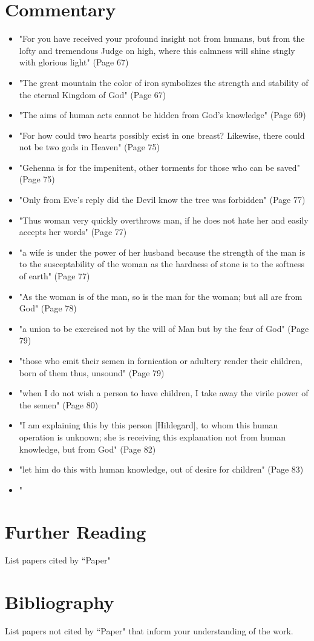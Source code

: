\documentclass{article}
\begin{document}
\section{Commentary}
\begin{itemize}

    \item "For you have received your profound insight not from humans, but from the lofty and tremendous Judge on high, where this calmness will shine stngly with glorious light" (Page 67)
    \item "The great mountain the color of iron symbolizes the strength and stability of the eternal Kingdom of God" (Page 67)
    \item "The aims of human acts cannot be hidden from God's knowledge" (Page 69)
    \item "For how could two hearts possibly exist in one breast? Likewise, there could not be two gods in Heaven" (Page 75)
    \item "Gehenna is for the impenitent, other torments for those who can be saved" (Page 75)
    \item "Only from Eve's reply did the Devil know the tree was forbidden" (Page 77)
    \item "Thus woman very quickly overthrows man, if he does not hate her and easily accepts her words" (Page 77)
    \item "a wife is under the power of her husband because the strength of the man is to the susceptability of the woman as the hardness of stone is to the softness of earth" (Page 77)
    \item "As the woman is of the man, so is the man for the woman; but all are from God" (Page 78)
    \item "a union to be exercised not by the will of Man but by the fear of God" (Page 79)
    \item "those who emit their semen in fornication or adultery render their children, born of them thus, unsound" (Page 79)
    \item "when I do not wish a person to have children, I take away the virile power of the semen" (Page 80)
    \item "I am explaining this by this person [Hildegard], to whom this human operation is unknown; she is receiving this explanation not from human knowledge, but from God" (Page 82)
    \item "let him do this with human knowledge, out of desire for children" (Page 83)
    \item "

\end{itemize}

\section{Further Reading}
List papers cited by ``Paper"

\section{Bibliography}
List papers not cited by ``Paper" that inform your understanding of the work.
\end{document}
